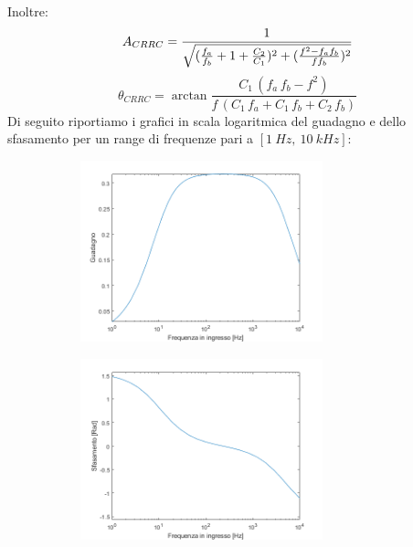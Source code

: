 Inoltre:
\begin{equation}
    A_{CRRC} = {1\over{\sqrt{({f_a\over{f_b}} + 1 + {C_2\over{C_1}})^2 + ({{f^2 - f_a f_b}\over{f f_b}})^2}}}
\end{equation}
\begin{equation}
    {\theta}_{CRRC} = \arctan{\frac{C_1 \,{\left(f_a \,f_b -f^2 \right)}}{f\,{\left(C_1 \,f_a +C_1 \,f_b +C_2 \,f_b \right)}}}
\end{equation}
Di seguito riportiamo i grafici in scala logaritmica del guadagno e dello sfasamento per un range di frequenze pari a $[1 \: Hz, \: 10 \: kHz]$:

\begin{figure}[H]
\caption{}
	\centering
	\begin{subfigure}
	\centering
		\includegraphics[width=7cm]{settimana_2/immagini/CRRCguadagno.png}
	\end{subfigure}
	\begin{subfigure}
	\centering
		\includegraphics[width=7cm]{settimana_2/immagini/CRRCsfasamento.png}
	\end{subfigure}
\end{figure}

